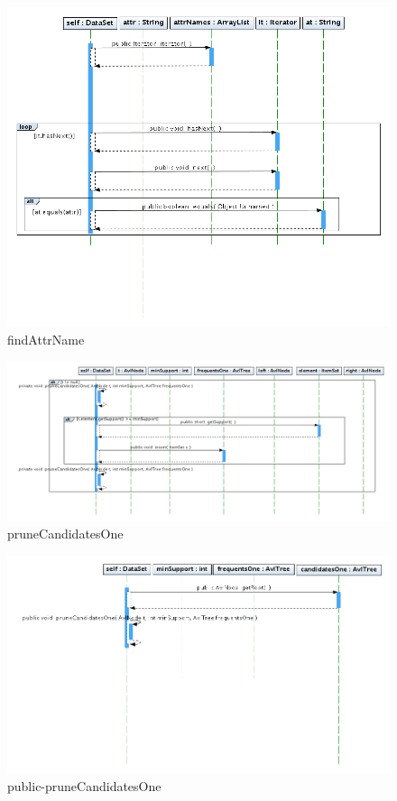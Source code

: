 \newpage
\begin{figure}
\includegraphics[width=1.2\textwidth]{DataSet/findAttrName.png}
\caption{findAttrName}
\end{figure}
\newpage
\begin{figure}
\includegraphics[width=1.2\textwidth]{DataSet/pruneCandidatesOne.png}
\caption{pruneCandidatesOne}
\end{figure}
\newpage
\begin{figure}
\includegraphics[width=1.2\textwidth]{DataSet/pruneCandidatesOne_public.png}
\caption{public-pruneCandidatesOne}
\end{figure}
\newpage




